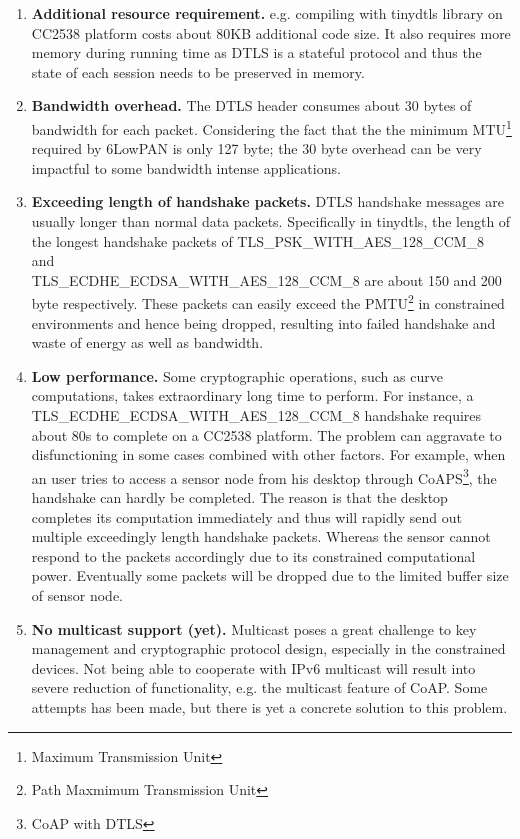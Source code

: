 \begin{enumerate}
\item \textbf{Additional resource requirement.} e.g. compiling with tinydtls library on CC2538 platform costs about 80KB additional code size. It also requires more memory during running time as DTLS is a stateful protocol and thus the state of each session needs to be preserved in memory.
\item \textbf{Bandwidth overhead.} The DTLS header consumes about 30 bytes of bandwidth for each packet. Considering the fact that the the minimum MTU\footnote{Maximum Transmission Unit} required by 6LowPAN is only 127 byte; the 30 byte overhead can be very impactful to some bandwidth intense applications. 
\item \textbf{Exceeding length of handshake packets.} DTLS handshake messages are usually longer than normal data packets. Specifically in tinydtls, the length of the longest handshake packets of 
TLS\_PSK\_WITH\_AES\_128\_CCM\_8 \\
and \\
TLS\_ECDHE\_ECDSA\_WITH\_AES\_128\_CCM\_8 are about 150 and 200 byte respectively. These packets can easily exceed the PMTU\footnote{Path Maxmimum Transmission Unit} in constrained environments and hence being dropped, resulting into failed handshake and waste of energy as well as bandwidth.
\item\textbf{Low performance.} Some cryptographic operations, such as curve computations, takes extraordinary long time to perform. For instance, a \\ TLS\_ECDHE\_ECDSA\_WITH\_AES\_128\_CCM\_8 handshake requires about 80s to complete on a CC2538 platform. The problem can aggravate to disfunctioning in some cases combined with other factors. For example, when an user tries to access a sensor node from his desktop through CoAPS\footnote{CoAP with DTLS}, the handshake can hardly be completed. The reason is that the desktop completes its computation immediately and thus will rapidly send out multiple exceedingly length handshake packets. Whereas the sensor cannot respond to the packets accordingly due to its constrained computational power.  Eventually some packets will be dropped due to the limited buffer size of sensor node.
\item \textbf{No multicast support (yet).} Multicast poses a great challenge to key management and cryptographic protocol design, especially in the constrained devices. Not being able to cooperate with IPv6 multicast will result into severe reduction of functionality, e.g. the multicast feature of CoAP. Some attempts\cite{multicast1}\cite{multicast2} has been made, but there is yet a concrete solution to this problem.
\end{enumerate}

